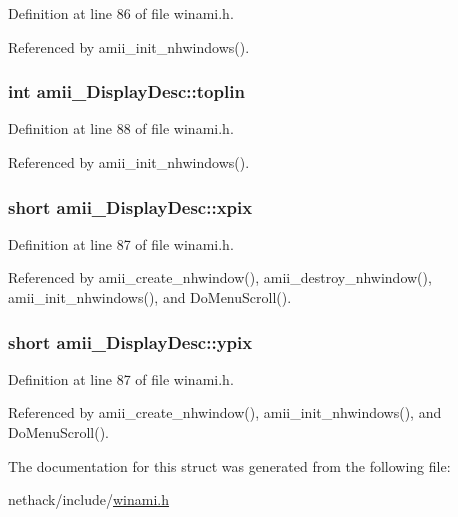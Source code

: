 Definition at line 86 of file winami.\+h.



Referenced by amii\+\_\+init\+\_\+nhwindows().

\hypertarget{structamii__DisplayDesc_ae1f6917b2fc9ca142cd05d6fb615845d}{
\subsubsection[{toplin}]{\setlength{\rightskip}{0pt plus 5cm}int amii\+\_\+\+Display\+Desc\+::toplin}}\label{structamii__DisplayDesc_ae1f6917b2fc9ca142cd05d6fb615845d}


Definition at line 88 of file winami.\+h.



Referenced by amii\+\_\+init\+\_\+nhwindows().

\hypertarget{structamii__DisplayDesc_af95f6ae98ff1f0ccc96b06fdd296530e}{
\subsubsection[{xpix}]{\setlength{\rightskip}{0pt plus 5cm}short amii\+\_\+\+Display\+Desc\+::xpix}}\label{structamii__DisplayDesc_af95f6ae98ff1f0ccc96b06fdd296530e}


Definition at line 87 of file winami.\+h.



Referenced by amii\+\_\+create\+\_\+nhwindow(), amii\+\_\+destroy\+\_\+nhwindow(), amii\+\_\+init\+\_\+nhwindows(), and Do\+Menu\+Scroll().

\hypertarget{structamii__DisplayDesc_a24ab4ee31424d8d41235227d2d919b4e}{
\subsubsection[{ypix}]{\setlength{\rightskip}{0pt plus 5cm}short amii\+\_\+\+Display\+Desc\+::ypix}}\label{structamii__DisplayDesc_a24ab4ee31424d8d41235227d2d919b4e}


Definition at line 87 of file winami.\+h.



Referenced by amii\+\_\+create\+\_\+nhwindow(), amii\+\_\+init\+\_\+nhwindows(), and Do\+Menu\+Scroll().



The documentation for this struct was generated from the following file\+:\begin{DoxyCompactItemize}
\item 
nethack/include/\hyperlink{winami_8h}{winami.\+h}\end{DoxyCompactItemize}
